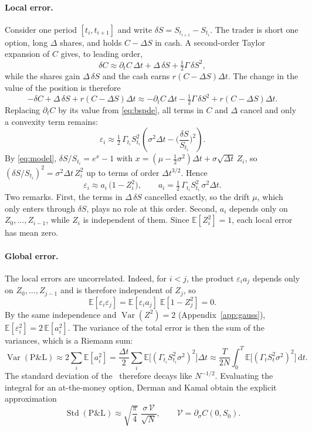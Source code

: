 \documentclass[11pt,a4paper]{article}
\newcommand{\E}{\mathbb{E}}
\newcommand{\dd}{\mathrm{d}}
\newcommand{\PnL}{\text{P\&L}}
\begin{document}
\paragraph{Local error.} Consider one period $[t_i, t_{i+1}]$ and write $\delta S = S_{t_{i+1}} - S_{t_i}$. The trader is short one option, long $\Delta$ shares, and holds $C - \Delta S$ in cash. A second-order Taylor expansion of $C$ gives, to leading order,
\[
  \delta C \approx \partial_t C\,\Delta t + \Delta\,\delta S + \tfrac12\Gamma\,\delta S^2 ,
\]
while the shares gain $\Delta\,\delta S$ and the cash earns $r(C - \Delta S)\Delta t$. The change in the value of the position is therefore
\[
  -\delta C + \Delta\,\delta S + r(C-\Delta S)\Delta t
  \approx -\partial_t C\,\Delta t - \tfrac12\Gamma\,\delta S^2 + r(C - \Delta S)\Delta t .
\]
Replacing $\partial_t C$ by its value from \eqref{eq:bspde}, all terms in $C$ and $\Delta$ cancel and only a convexity term remains:
\begin{equation}\label{eq:localerror}
  \varepsilon_i \approx \tfrac12\,\Gamma_{t_i} S_{t_i}^2\left(\sigma^2\Delta t - \Big(\frac{\delta S}{S_{t_i}}\Big)^2\right).
\end{equation}
By \eqref{eq:model}, $\delta S/S_{t_i} = e^{x}-1$ with $x = (\mu-\tfrac12\sigma^2)\Delta t + \sigma\sqrt{\Delta t}\,Z_i$, so $(\delta S/S_{t_i})^2 = \sigma^2\Delta t\,Z_i^2$ up to terms of order $\Delta t^{3/2}$. Hence
\begin{equation}\label{eq:localerror2}
  \varepsilon_i \approx a_i\,\big(1 - Z_i^2\big),\qquad a_i = \tfrac12\,\Gamma_{t_i} S_{t_i}^2\,\sigma^2\Delta t .
\end{equation}
Two remarks. First, the terms in $\Delta\,\delta S$ cancelled exactly, so the drift $\mu$, which only enters through $\delta S$, plays no role at this order. Second, $a_i$ depends only on $Z_0,\dots,Z_{i-1}$, while $Z_i$ is independent of them. Since $\E[Z_i^2] = 1$, each local error has mean zero.

\paragraph{Global error.} The local errors are uncorrelated. Indeed, for $i<j$, the product $\varepsilon_i a_j$ depends only on $Z_0,\dots,Z_{j-1}$ and is therefore independent of $Z_j$, so
\[
  \E[\varepsilon_i\varepsilon_j] = \E[\varepsilon_i a_j]\;\E[1-Z_j^2] = 0 .
\]
By the same independence and $\operatorname{Var}(Z^2) = 2$ (Appendix~\ref{app:gauss}), $\E[\varepsilon_i^2] = 2\,\E[a_i^2]$. The variance of the total error is then the sum of the variances, which is a Riemann sum:
\[
  \operatorname{Var}(\PnL) \approx 2\sum_{i} \E[a_i^2]
  = \frac{\Delta t}{2}\sum_i \E\big[(\Gamma_{t_i}S_{t_i}^2\sigma^2)^2\big]\Delta t
  \approx \frac{T}{2N}\int_0^T \E\big[(\Gamma_t S_t^2\sigma^2)^2\big]\,\dd t .
\]
The standard deviation of the \PnL\ therefore decays like $N^{-1/2}$. Evaluating the integral for an at-the-money option, Derman and Kamal \cite{DermanKamal1999} obtain the explicit approximation
\begin{equation}\label{eq:dk}
  \operatorname{Std}(\PnL) \approx \sqrt{\frac{\pi}{4}}\;\frac{\sigma\,\mathcal V}{\sqrt N},\qquad \mathcal V = \partial_\sigma C(0,S_0).
\end{equation}
\end{document}
